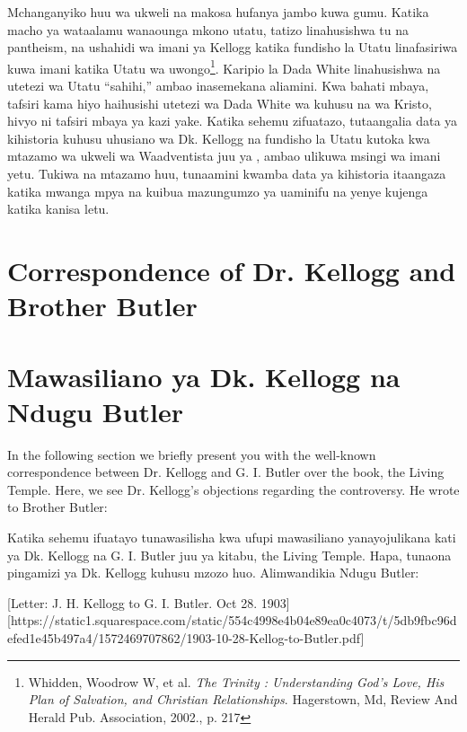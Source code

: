 Mchanganyiko huu wa ukweli na makosa hufanya jambo kuwa gumu. Katika macho ya wataalamu wanaounga mkono utatu, tatizo linahusishwa tu na pantheism, na ushahidi wa imani ya Kellogg katika fundisho la Utatu linafasiriwa kuwa imani katika Utatu wa uwongo\footnote{Whidden, Woodrow W, et al. \textit{The Trinity : Understanding God's Love, His Plan of Salvation, and Christian Relationships}. Hagerstown, Md, Review And Herald Pub. Association, 2002., p. 217}. Karipio la Dada White linahusishwa na utetezi wa Utatu “sahihi,” ambao inasemekana aliamini. Kwa bahati mbaya, tafsiri kama hiyo haihusishi utetezi wa Dada White wa  kuhusu  na wa Kristo, hivyo ni tafsiri mbaya ya kazi yake. Katika sehemu zifuatazo, tutaangalia data ya kihistoria kuhusu uhusiano wa Dk. Kellogg na fundisho la Utatu kutoka kwa mtazamo wa ukweli wa Waadventista juu ya , ambao ulikuwa msingi wa imani yetu. Tukiwa na mtazamo huu, tunaamini kwamba data ya kihistoria itaangaza katika mwanga mpya na kuibua mazungumzo ya uaminifu na yenye kujenga katika kanisa letu.


\section*{Correspondence of Dr. Kellogg and Brother Butler}


\section*{Mawasiliano ya Dk. Kellogg na Ndugu Butler}


In the following section we briefly present you with the well-known correspondence between Dr. Kellogg and G. I. Butler over the book, the Living Temple. Here, we see Dr. Kellogg’s objections regarding the controversy. He wrote to Brother Butler:


Katika sehemu ifuatayo tunawasilisha kwa ufupi mawasiliano yanayojulikana kati ya Dk. Kellogg na G. I. Butler juu ya kitabu, the Living Temple. Hapa, tunaona pingamizi ya Dk. Kellogg kuhusu mzozo huo. Alimwandikia Ndugu Butler:


[Letter: J. H. Kellogg to G. I. Butler. Oct 28. 1903][https://static1.squarespace.com/static/554c4998e4b04e89ea0c4073/t/5db9fbc96defed1e45b497a4/1572469707862/1903-10-28-Kellog-to-Butler.pdf]


